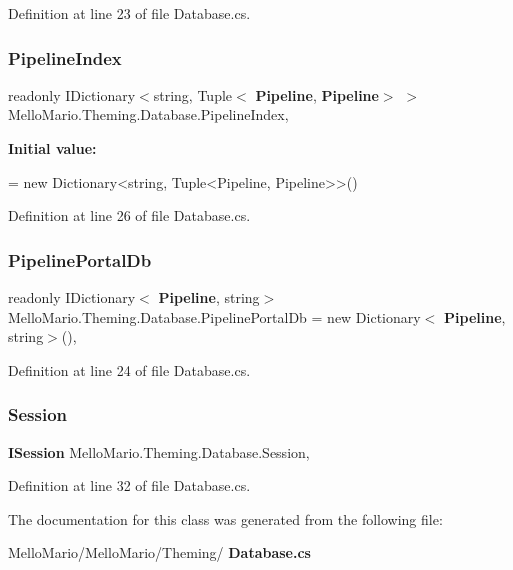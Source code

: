 Definition at line 23 of file Database.\+cs.

\mbox{\label{classMelloMario_1_1Theming_1_1Database_a433571d303671dce87c88b030f95f384}} 
\subsubsection{Pipeline\+Index}
{\footnotesize\ttfamily readonly I\+Dictionary$<$string, Tuple$<$\textbf{ Pipeline}, \textbf{ Pipeline}$>$ $>$ Mello\+Mario.\+Theming.\+Database.\+Pipeline\+Index\hspace{0.3cm}{\ttfamily [static]}, {\ttfamily [private]}}

{\bfseries Initial value\+:}
\begin{DoxyCode}
=
            \textcolor{keyword}{new} Dictionary<string, Tuple<Pipeline, Pipeline>>()
\end{DoxyCode}


Definition at line 26 of file Database.\+cs.

\mbox{\label{classMelloMario_1_1Theming_1_1Database_a5a983ad82670d0db3ea47120b3692a86}} 
\subsubsection{Pipeline\+Portal\+Db}
{\footnotesize\ttfamily readonly I\+Dictionary$<$\textbf{ Pipeline}, string$>$ Mello\+Mario.\+Theming.\+Database.\+Pipeline\+Portal\+Db = new Dictionary$<$\textbf{ Pipeline}, string$>$()\hspace{0.3cm}{\ttfamily [static]}, {\ttfamily [private]}}



Definition at line 24 of file Database.\+cs.

\mbox{\label{classMelloMario_1_1Theming_1_1Database_a040ffd9199ffb6348176c14b324b2497}} 
\subsubsection{Session}
{\footnotesize\ttfamily \textbf{ I\+Session} Mello\+Mario.\+Theming.\+Database.\+Session\hspace{0.3cm}{\ttfamily [static]}, {\ttfamily [private]}}



Definition at line 32 of file Database.\+cs.



The documentation for this class was generated from the following file\+:\begin{DoxyCompactItemize}
\item 
Mello\+Mario/\+Mello\+Mario/\+Theming/\textbf{ Database.\+cs}\end{DoxyCompactItemize}
